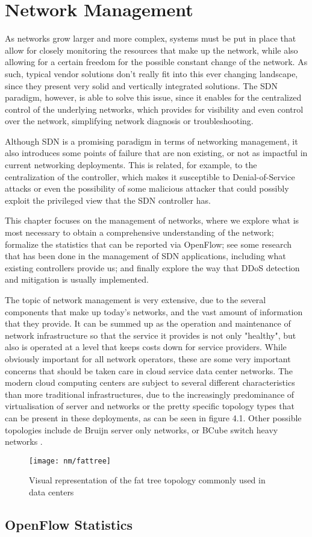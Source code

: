 \chapter{Network Management} \label{chap:nm} %

As networks grow larger and more complex, systems must be put in place that allow for closely monitoring the resources that make up the network, while also allowing for a certain freedom for the possible constant change of the 
network. As such, typical vendor solutions don't really fit into this ever changing landscape, since they present very solid and vertically integrated solutions. The SDN paradigm, however, is able to solve this issue, since it 
enables for the centralized control of the underlying networks, which provides for visibility and even control over the network, simplifying network diagnosis or troubleshooting. 
\par Although SDN is a promising paradigm in terms of networking management, it also introduces some points of failure that are non existing, or not as impactful in current networking deployments. This is related, for example,
to the centralization of the controller, which makes it susceptible to Denial-of-Service attacks or even the possibility of some malicious attacker that could possibly exploit the privileged view that the SDN controller has.
\par This chapter focuses on the management of networks, where we explore what is most necessary to obtain a comprehensive understanding of the network; formalize the statistics that can be reported via OpenFlow; see some 
research that has been done in the management of SDN applications, including what existing controllers provide us; and finally explore the way that DDoS detection and mitigation is usually implemented.

\par The topic of network management is very extensive, due to the several components that make up today's networks, and the vast amount of information that they provide. It can be summed up as the operation and maintenance 
of network infrastructure so that the service it provides is not only "healthy", but also is operated at a level that keeps costs down for service providers. While obviously important for all network operators, these are 
some very important concerns that should be taken care in cloud service data center networks. The modern cloud computing centers are subject to several different characteristics than more traditional infrastructures, due to the 
increasingly predominance of virtualisation of server and networks or the pretty specific topology types that can be present in these deployments,  as can be seen in figure 4.1. Other possible topologies include de Bruijn server only
networks, or BCube switch heavy networks \cite{ popa_cost_2010 }.

\begin{figure} [h]
    \texttt{[image: nm/fattree]}
\caption{Visual representation of the fat tree topology commonly used in data centers}
\end{figure}


\section {OpenFlow Statistics}




